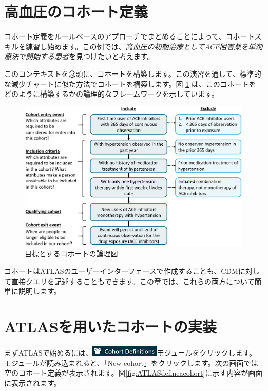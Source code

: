 \documentclass[
  11pt]{book}
\theoremstyle{definition}
\theoremstyle{definition}
\theoremstyle{definition}
\theoremstyle{definition}
\theoremstyle{remark}
\begin{document}
\section{高血圧のコホート定義}\label{ux9ad8ux8840ux5727ux306eux30b3ux30dbux30fcux30c8ux5b9aux7fa9}

コホート定義をルールベースのアプローチでまとめることによって、コホートスキルを練習し始めます。この例では、\emph{高血圧の初期治療としてACE阻害薬を単剤療法で開始する患者}を見つけたいと考えます。

このコンテキストを念頭に、コホートを構築します。この演習を通して、標準的な減少チャートに似た方法でコホートを構築します。図 \ref{fig:CohortPractice} は、このコホートをどのように構築するかの論理的なフレームワークを示しています。

\begin{figure}

{\centering \includegraphics[width=1\linewidth]{images/Cohorts/CohortPractice} 

}

\caption{目標とするコホートの論理図}\label{fig:CohortPractice}
\end{figure}

コホートはATLASのユーザーインターフェースで作成することも、CDMに対して直接クエリを記述することもできます。この章では、これらの両方について簡単に説明します。

\section{ATLASを用いたコホートの実装}\label{atlasux3092ux7528ux3044ux305fux30b3ux30dbux30fcux30c8ux306eux5b9fux88c5}

まずATLASで始めるには、\includegraphics{images/Cohorts/cohortdefinition.png}モジュールをクリックします。モジュールが読み込まれると、「New cohort」をクリックします。次の画面では空のコホート定義が表示されます。図\ref{fig:ATLASdefineacohort}に示す内容が画面に表示されます。
\end{document}
